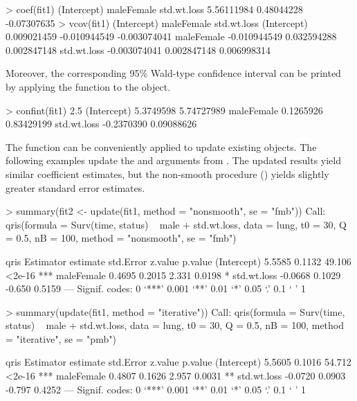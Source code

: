 \begin{example}
  > coef(fit1)
  (Intercept)    maleFemale    std.wt.loss 
  5.56111984     0.48044228    -0.07307635 
  > vcov(fit1)
                 (Intercept)   maleFemale    std.wt.loss 
  (Intercept)    0.009021459 -0.010944549   -0.003074041
  maleFemale    -0.010944549  0.032594288    0.002847148
  std.wt.loss   -0.003074041  0.002847148    0.006998314
\end{example}
% 
Moreover, the corresponding 95\% Wald-type confidence interval can be printed by applying 
the  function to the  object.
\begin{example}
  > confint(fit1)
                    2.5 %
  (Intercept)   5.3749598 5.74727989
  maleFemale    0.1265926 0.83429199
  std.wt.loss  -0.2370390 0.09088626
\end{example}
% 

The  function can be conveniently applied to update existing  objects. 
The following examples update the  and  arguments from .
The updated results yield similar coefficient estimates, but the non-smooth procedure () 
yields slightly greater standard error estimates.
\begin{example}
  > summary(fit2 <- update(fit1, method = "nonsmooth", se = "fmb"))
  Call:
  qris(formula = Surv(time, status) ~ male + std.wt.loss,
  data = lung, t0 = 30, Q = 0.5, nB = 100, method = "nonsmooth", 
  se = "fmb")

  qris Estimator
               estimate std.Error z.value p.value    
  (Intercept)    5.5585    0.1132  49.106  <2e-16 ***
  maleFemale     0.4695    0.2015   2.331  0.0198 *  
  std.wt.loss   -0.0668    0.1029  -0.650  0.5159    
  ---
  Signif. codes:  0 ‘***’ 0.001 ‘**’ 0.01 ‘*’ 0.05 ‘.’ 0.1 ‘ ’ 1          
\end{example}
% 

\begin{example}
  > summary(update(fit1, method = "iterative"))
  Call:
  qris(formula = Surv(time, status) ~ male + std.wt.loss,
  data = lung, t0 = 30, Q = 0.5, nB = 100, method = "iterative", 
  se = "pmb")

  qris Estimator
               estimate std.Error z.value p.value    
  (Intercept)    5.5605    0.1016  54.712  <2e-16 ***
  maleFemale     0.4807    0.1626   2.957  0.0031 ** 
  std.wt.loss   -0.0720    0.0903  -0.797  0.4252    
  ---
  Signif. codes:  0 ‘***’ 0.001 ‘**’ 0.01 ‘*’ 0.05 ‘.’ 0.1 ‘ ’ 1
\end{example}
% 

